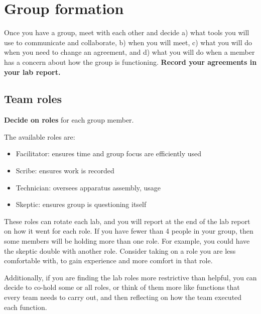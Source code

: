 \section{Group formation}

\begin{steps}
	\item Once you have a group, meet with each other and decide a) what tools you will use to communicate and collaborate, b) when you will meet, c) what you will do when you need to change an agreement, and d) what you will do when a member has a concern about how the group is functioning. \textbf{Record your agreements in your lab report.} %
\end{steps}

\subsection{Team roles}

\begin{steps}
	\item \textbf{Decide on roles} for each group member.
\end{steps}

The available roles are:

\begin{itemize}
	\item Facilitator: ensures time and group focus are efficiently used
	\item Scribe: ensures work is recorded
	\item Technician: oversees apparatus assembly, usage
	\item Skeptic: ensures group is questioning itself
\end{itemize}

These roles can rotate each lab, and you will report at the end of the lab report on how it went for each role. If you have fewer than 4 people in your group, then some members will be holding more than one role. For example, you could have the skeptic double with another role. Consider taking on a role you are less comfortable with, to gain experience and more comfort in that role.

Additionally, if you are finding the lab roles more restrictive than helpful, you can decide to co-hold some or all roles, or think of them more like functions that every team needs to carry out, and then reflecting on how the team executed each function.

